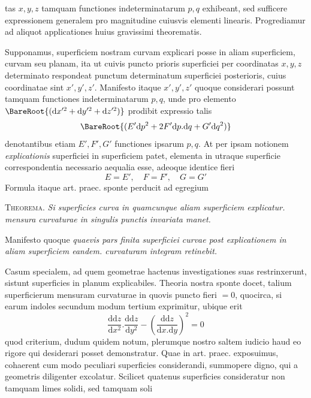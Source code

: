 %
tas \(x,y,z\) tamquam functiones indeterminatarum \(p,q\) exhibeant, sed sufficere expressionem generalem pro magnitudine cuiusvis elementi linearis. Progrediamur ad aliquot applicationes huius gravissimi theorematis.

Supponamus, superficiem nostram curvam explicari posse in aliam superficiem, curvam seu planam, ita ut cuivis puncto prioris superficiei per coordinatas \(x,y,z\) determinato respondeat punctum determinatum superficiei posterioris, cuius coordinatae sint \(x',y',z'\). Manifesto itaque \(x',y',z'\) quoque considerari possunt tamquam functiones indeterminatarum \(p,q\), unde pro elemento \(\BareRoot{(\mathrm{d}x'^2+\mathrm{d}y'^2+\mathrm{d}z'^2)}\) prodibit expressio talis
\[
\BareRoot{(E'\mathrm{d}p^2+2F'\mathrm{d}p\mathord{.}\mathrm{d}q+G'\mathrm{d}q^2)}
\]
denotantibus etiam \(E',F',G'\) functiones ipsarum \(p,q\). At per ipsam notionem \textit{explicationis} superficiei in superficiem patet, elementa in utraque superficie correspondentia necessario aequalia esse, adeoque identice fieri
\[
E=E',\quad F=F',\quad G=G'
\]
Formula itaque art. praec. sponte perducit ad egregium

\textsc{Theorema.} \textit{Si superficies curva in quamcunque aliam superficiem explicatur. mensura curvaturae in singulis punctis invariata manet.}

Manifesto quoque \textit{quaevis pars finita superficiei curvae post explicationem in aliam superficiem eandem. curvaturam integram retinebit.}

Casum specialem, ad quem geometrae hactenus investigationes suas restrinxerunt, sistunt superficies in planum explicabiles. Theoria nostra sponte docet, talium superficierum mensuram curvaturae in quovis puncto fieri \(=0\), quocirca, si earum indoles secundum modum tertium exprimitur, ubique erit
\[
\frac{\mathrm{d}\mathrm{d}z}{\mathrm{d}x^2}\mathord{.}\frac{\mathrm{d}\mathrm{d}z}{\mathrm{d}y^2}-(\frac{\mathrm{d}\mathrm{d}z}{\mathrm{d}x\mathord{.}\mathrm{d}y})^2=0
\]
quod criterium, dudum quidem notum, plerumque nostro saltem iudicio haud eo rigore qui desiderari posset demonstratur.
Quae in art. praec. exposuimus, cohaerent cum modo peculiari superficies considerandi, summopere digno, qui a geometris diligenter excolatur. Scilicet quatenus superficies consideratur non tamquam limes solidi, sed tamquam soli%
